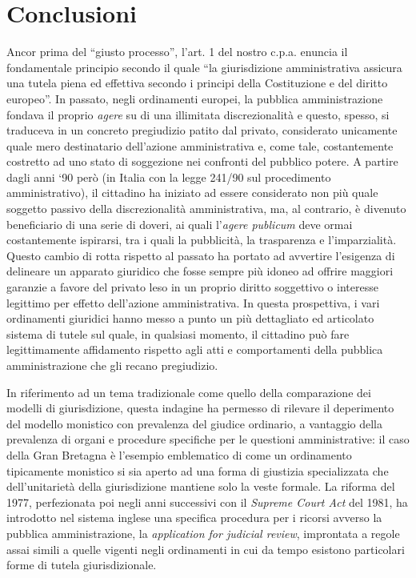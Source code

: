 \documentclass[12pt,it,a4paper,]{report}
\begin{document}
\hypertarget{conclusioni}{%
\chapter*{Conclusioni}\label{conclusioni}}

Ancor prima del ``giusto processo'', l'art. 1 del nostro c.p.a. enuncia
il fondamentale principio secondo il quale ``la giurisdizione
amministrativa assicura una tutela piena ed effettiva secondo i principi
della Costituzione e del diritto europeo''. In passato, negli
ordinamenti europei, la pubblica amministrazione fondava il proprio
\emph{agere} su di una illimitata discrezionalità e questo, spesso, si
traduceva in un concreto pregiudizio patito dal privato, considerato
unicamente quale mero destinatario dell'azione amministrativa e, come
tale, costantemente costretto ad uno stato di soggezione nei confronti
del pubblico potere. A partire dagli anni `90 però (in Italia con la
legge 241/90 sul procedimento amministrativo), il cittadino ha iniziato
ad essere considerato non più quale soggetto passivo della
discrezionalità amministrativa, ma, al contrario, è divenuto
beneficiario di una serie di doveri, ai quali l'\emph{agere publicum}
deve ormai costantemente ispirarsi, tra i quali la pubblicità, la
trasparenza e l'imparzialità. Questo cambio di rotta rispetto al passato
ha portato ad avvertire l'esigenza di delineare un apparato giuridico
che fosse sempre più idoneo ad offrire maggiori garanzie a favore del
privato leso in un proprio diritto soggettivo o interesse legittimo per
effetto dell'azione amministrativa. In questa prospettiva, i vari
ordinamenti giuridici hanno messo a punto un più dettagliato ed
articolato sistema di tutele sul quale, in qualsiasi momento, il
cittadino può fare legittimamente affidamento rispetto agli atti e
comportamenti della pubblica amministrazione che gli recano pregiudizio.

In riferimento ad un tema tradizionale come quello della comparazione
dei modelli di giurisdizione, questa indagine ha permesso di rilevare il
deperimento del modello monistico con prevalenza del giudice ordinario,
a vantaggio della prevalenza di organi e procedure specifiche per le
questioni amministrative: il caso della Gran Bretagna è l'esempio
emblematico di come un ordinamento tipicamente monistico si sia aperto
ad una forma di giustizia specializzata che dell'unitarietà della
giurisdizione mantiene solo la veste formale. La riforma del 1977,
perfezionata poi negli anni successivi con il \emph{Supreme Court Act}
del 1981, ha introdotto nel sistema inglese una specifica procedura per
i ricorsi avverso la pubblica amministrazione, la \emph{application for
judicial review}, improntata a regole assai simili a quelle vigenti
negli ordinamenti in cui da tempo esistono particolari forme di tutela
giurisdizionale.
\end{document}

